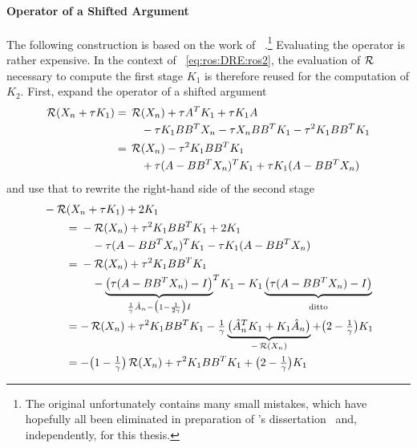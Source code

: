 \pagebreak

\paragraph{\Riccati Operator of a Shifted Argument}

The following construction is based on the work of \citeauthor{Mena2007}~\cite{Mena2007}.\footnote{%
  The original unfortunately contains many small mistakes,
  which have hopefully all been eliminated in preparation of
  \citeauthor{Lang2017}'s dissertation~\cite{Lang2017}
  and, independently, for this thesis.
}
Evaluating the \Riccati operator is rather expensive.
In the context of ~\eqref{eq:ros:DRE:ros2},
the evaluation of $\operatorname{\mathcal R}$ necessary to compute the first stage $K_1$
is therefore reused for the computation of $K_2$.
First, expand the \Riccati operator of a shifted argument
\begin{subequations}
\begin{align}
  \Ricc(X_n + \tau K_1)
  &= \begin{multlined}[t]
    \Ricc(X_n) + \tau A^\T K_1 + \tau K_1 A \\
    - \tau K_1 BB^\T X_n - \tau X_n BB^\T K_1 - \tau^2 K_1 BB^\T K_1
  \end{multlined} \\
  &= \begin{multlined}[t]
    \Ricc(X_n) - \tau^2 K_1 BB^\T K_1 \\
    + \tau(A - BB^\T X_n)^\T K_1 + \tau K_1 (A - BB^\T X_n)
  \end{multlined}
\end{align}
\end{subequations}
and use that to rewrite the right-hand side of the second stage
\begin{subequations}
\begin{align}
  \MoveEqLeft
  -\Ricc(X_n + \tau K_1) + 2K_1
  \nonumber \\
  &= \begin{multlined}[t]
    -\Ricc(X_n) + \tau^2 K_1 BB^\T K_1 + 2K_1 \\
    - \tau(A - BB^\T X_n)^\T K_1 - \tau K_1 (A - BB^\T X_n)
  \end{multlined} \\
  &= \begin{multlined}[t]
    -\Ricc(X_n) + \tau^2 K_1 BB^\T K_1 \\
    - \underbrace{
      \big(\tau(A - BB^\T X_n) - I\big)
    }_{\frac{1}{\gamma} \hat{A}_n - \big( 1-\frac{1}{2\gamma} \big) I}
    \!{\vphantom{\big(}}^\T
    K_1
    - K_1
    \underbrace{
      \big(\tau(A - BB^\T X_n) - I\big)
    }_{\vphantom{\big(}\text{ditto}}
  \end{multlined} \\
  &=
  -\Ricc(X_n) + \tau^2 K_1 BB^\T K_1
  -\tfrac{1}{\gamma}
  \underbrace{
    \big( \hat{A}_n^\T K_1 + K_1 \hat{A}_n \big)
  }_{-\Ricc(X_n)}
  + \big( 2-\tfrac{1}{\gamma} \big) K_1 \\
  &= -\big(1-\tfrac{1}{\gamma}\big) \Ricc(X_n)
  + \tau^2 K_1 BB^\T K_1
  + \big( 2-\tfrac{1}{\gamma} \big) K_1
\end{align}
\end{subequations}
